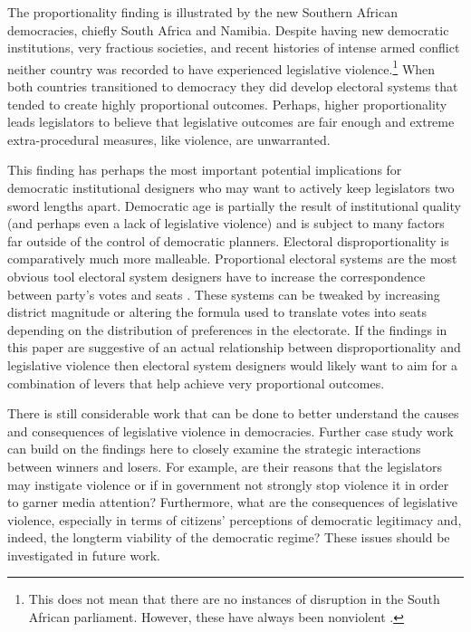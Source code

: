 \documentclass[a4paper]{article}\usepackage{graphicx, color}
\begin{document}
The proportionality finding is illustrated by the new Southern African democracies, chiefly South Africa and Namibia. Despite having new democratic institutions, very fractious societies, and recent histories of intense armed conflict neither country was recorded to have experienced legislative violence.\footnote{This does not mean that there are no instances of disruption in the South African parliament. However, these have always been nonviolent \cite{Johnson2013}.} When both countries transitioned to democracy they did develop electoral systems that tended to create highly proportional outcomes. Perhaps, higher proportionality leads legislators to believe that legislative outcomes are fair enough and extreme extra-procedural measures, like violence, are unwarranted.    

This finding has perhaps the most important potential implications for democratic institutional designers who may want to actively keep legislators two sword lengths apart. Democratic age is partially the result of institutional quality (and perhaps even a lack of legislative violence) and is subject to many factors far outside of the control of democratic planners. Electoral disproportionality is comparatively much more malleable. Proportional electoral systems are the most obvious tool electoral system designers have to increase the correspondence between party's votes and seats \citep{Carey2011}. These systems can be tweaked by increasing district magnitude or altering the formula used to translate votes into seats depending on the distribution of preferences in the electorate. If the findings in this paper are suggestive of an actual relationship between disproportionality and legislative violence then electoral system designers would likely want to aim for a combination of levers that help achieve very proportional outcomes. 

There is still considerable work that can be done to better understand the causes and consequences of legislative violence in democracies. Further case study work can build on the findings here to closely examine the strategic interactions between winners and losers. For example, are their reasons that the legislators may instigate violence or if in government not strongly stop violence it in order to garner media attention? Furthermore, what are the consequences of legislative violence, especially in terms of citizens' perceptions of democratic legitimacy and, indeed, the longterm viability of the democratic regime? These issues should be investigated in future work. 
\end{document}
